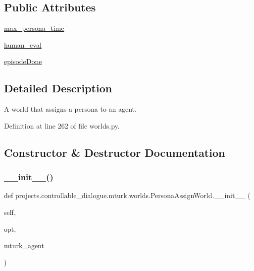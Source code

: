 \subsection*{Public Attributes}
\begin{DoxyCompactItemize}
\item 
\hyperlink{classprojects_1_1controllable__dialogue_1_1mturk_1_1worlds_1_1PersonaAssignWorld_a875349c4ad910d85489934e5cc3f4286}{max\+\_\+persona\+\_\+time}
\item 
\hyperlink{classprojects_1_1controllable__dialogue_1_1mturk_1_1worlds_1_1PersonaAssignWorld_abe2ba6a74f6a5c747cffcd62a0db5cb2}{human\+\_\+eval}
\item 
\hyperlink{classprojects_1_1controllable__dialogue_1_1mturk_1_1worlds_1_1PersonaAssignWorld_a4820af5d7a4d448167b669d2b9a1a0ac}{episode\+Done}
\end{DoxyCompactItemize}


\subsection{Detailed Description}
\begin{DoxyVerb}A world that assigns a persona to an agent.
\end{DoxyVerb}
 

Definition at line 262 of file worlds.\+py.



\subsection{Constructor \& Destructor Documentation}
\mbox{\label{classprojects_1_1controllable__dialogue_1_1mturk_1_1worlds_1_1PersonaAssignWorld_a5a4e7ec8f20094ed50f4301233be7ae4}} 
\subsubsection{\texorpdfstring{\+\_\+\+\_\+init\+\_\+\+\_\+()}{\_\_init\_\_()}}
{\footnotesize\ttfamily def projects.\+controllable\+\_\+dialogue.\+mturk.\+worlds.\+Persona\+Assign\+World.\+\_\+\+\_\+init\+\_\+\+\_\+ (\begin{DoxyParamCaption}\item[{}]{self,  }\item[{}]{opt,  }\item[{}]{mturk\+\_\+agent }\end{DoxyParamCaption})}



